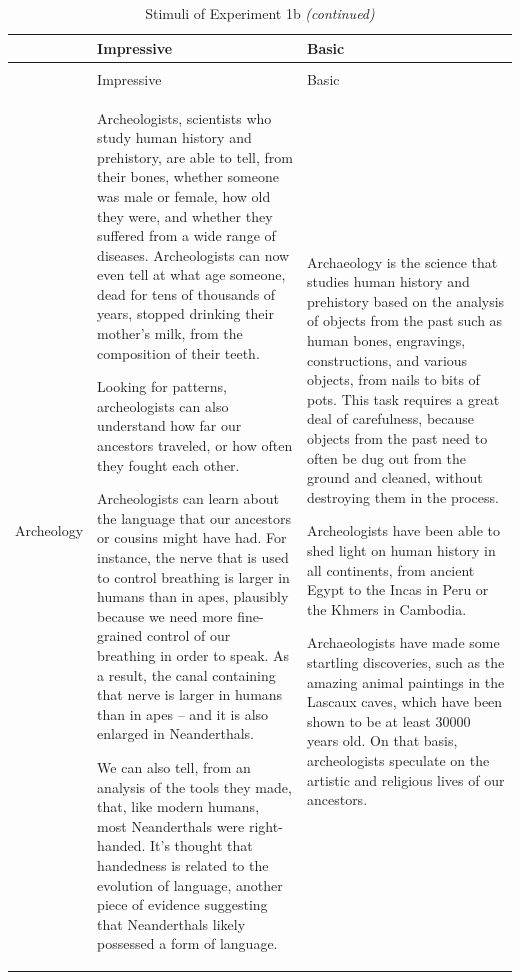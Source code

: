 \documentclass[
  english,
  doc,floatsintext]{apa6}
\begin{document}
\begin{longtable}[t]{>{\raggedright\arraybackslash}p{5em}>{\raggedright\arraybackslash}p{25em}>{\raggedright\arraybackslash}p{25em}}
\caption{\label{tab:exp1b-stimuli}Stimuli of Experiment 1b}\\
\toprule
 & Impressive & Basic\\
\midrule
\endfirsthead
\caption[]{\label{tab:exp1b-stimuli}Stimuli of Experiment 1b \textit{(continued)}}\\
\toprule
 & Impressive & Basic\\
\midrule
\endhead

\endfoot
\bottomrule
\endlastfoot
Archeology & Archeologists, scientists who study human history and prehistory, are able to tell, from their bones, whether someone was male or female, how old they were, and whether they suffered from a wide range of diseases. Archeologists can now even tell at what age someone, dead for tens of thousands of years, stopped drinking their mother’s milk, from the composition of their teeth. 

Looking for patterns, archeologists can also understand how far our ancestors traveled, or how often they fought each other.

Archeologists can learn about the language that our ancestors or cousins might have had. For instance, the nerve that is used to control breathing is larger in humans than in apes, plausibly because we need more fine-grained control of our breathing in order to speak. As a result, the canal containing that nerve is larger in humans than in apes – and it is also enlarged in Neanderthals. 

We can also tell, from an analysis of the tools they made, that, like modern humans, most Neanderthals were right-handed. It’s thought that handedness is related to the evolution of language, another piece of evidence suggesting that Neanderthals likely possessed a form of language. & Archaeology is the science that studies human history and prehistory based on the analysis of objects from the past such as human bones, engravings, constructions, and various objects, from nails to bits of pots. This task requires a great deal of carefulness, because objects from the past need to often be dug out from the ground and cleaned, without destroying them in the process. 

Archeologists have been able to shed light on human history in all continents, from ancient Egypt to the Incas in Peru or the Khmers in Cambodia. 

Archaeologists have made some startling discoveries, such as the amazing animal paintings in the Lascaux caves, which have been shown to be at least 30000 years old. On that basis, archeologists speculate on the artistic and religious lives of our ancestors. 


\end{longtable}
\end{document}
